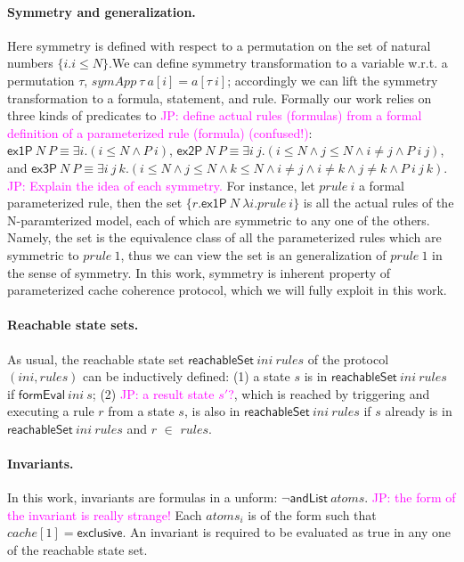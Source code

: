 \documentclass{llncs}
\newcommand\JP[1]{\textcolor{magenta}{JP: #1}}
\begin{document}
\paragraph*{Symmetry and generalization.}
Here symmetry is defined with respect to
a permutation on the set of natural numbers $\{i. i \le N\}$.We can
define symmetry transformation to a variable w.r.t. a permutation
$\tau$, $symApp~\tau~a[i]=a[\tau~i]$; accordingly we can lift the
symmetry transformation to a formula, statement, and rule. Formally
our work  relies on three kinds of predicates to \JP{define actual rules
(formulas) from a formal definition of a parameterized rule
(formula) (confused!)}: $\mathsf{ex1P}~ N~ P \equiv \exists i. (i \le N \wedge P~
i)$, $\mathsf{ex2P}~ N~ P \equiv \exists i~j. (i \le N \wedge j \le
N \wedge i\ne j \wedge P~ i~j)$, and $\mathsf{ex3P}~ N~ P \equiv
\exists i~j~k. (i \le N \wedge j \le N \wedge k \le N\wedge i\ne j
\wedge i\ne k \wedge j\ne k \wedge P~ i~j~k)$.
\JP{Explain the idea of each symmetry.}
For instance, let
$prule~i$ a formal parameterized rule, then the set $\{r.
\mathsf{ex1P}~ N~ \lambda i. prule ~i\}$ is all the actual rules of
the N-paramterized model, each of which are symmetric to  any one of
the others. Namely, the set is the equivalence class of all the
parameterized rules which are symmetric to $prule~1$, thus we can
view the set is an generalization of $prule~1$ in the sense of
symmetry. In this work, symmetry is inherent property of
parameterized cache coherence protocol, which we will fully exploit
in this work.

\paragraph*{Reachable state sets.}
As usual, the reachable state set
$\mathsf{reachableSet}~ ini ~rules$ of the protocol $(ini,rules)$
can be inductively defined: (1) a state $s$ is in
$\mathsf{reachableSet}~ini~ rules$ if
 $\mathsf{formEval}~ini~s$; (2) \JP{a result state $s'$?}, which is reached by triggering and
 executing a rule $r$ from a state $s$, is also in
 $\mathsf{reachableSet}~ini~ rules$ if  $s$ already is in
 $\mathsf{reachableSet}~ini~ rules$ and $r $ $\in$  $rules$.

\paragraph*{Invariants.}
In this work, invariants are formulas in a unform: $\neg\mathsf{andList}~atoms$.
\JP{the form of the invariant is really strange!}
Each $atoms_i$ is of the form such that
$cache[1]=\mathsf{exclusive}$. An invariant is required to be
evaluated as true in any one of the reachable state set.
\end{document}
